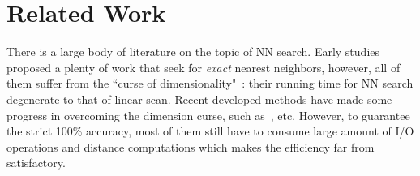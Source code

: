 \documentclass[twocolumn]{svjour3}          %
\begin{document}




\section{Related Work}\label{sec:relatedwork}
There is a large body of literature on the topic of NN search. Early studies proposed a plenty of work that seek for \emph{exact} nearest neighbors, 
however, all of them suffer from the ``curse of dimensionality"~\cite{Bohm2001,Weber1998}: their running time for NN search degenerate to that of linear scan. Recent developed methods have made some progress in overcoming the dimension curse, such as~\cite{Weber1998,Ferha2000,Jagadish2005iDistance,Ramaswamy2011HB,Feng2017HBPlus,Hwang2012FNN}, etc. However, to guarantee the strict 100\% accuracy, most of them still have to consume large amount of I/O operations and distance computations which makes the efficiency far from satisfactory.

\end{document}
